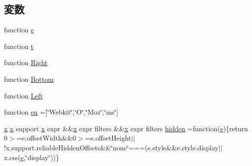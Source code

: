 \subsection*{変数}
\begin{DoxyCompactItemize}
\item 
function \hyperlink{jquery-1_810_82_8min_8js_a2c038346d47955cbe2cb91e338edd7e1}{e}
\item 
function \hyperlink{jquery-1_810_82_8min_8js_a23c5666e83bbbceee94adcd0851f50c4}{t}
\item 
function \hyperlink{jquery-1_810_82_8min_8js_ac7f66efc33d974809d85fc5bdb00c6eb}{Right}
\item 
function \hyperlink{jquery-1_810_82_8min_8js_aff76c1cba4a00c678dfce0e0c5a5538a}{Bottom}
\item 
function \hyperlink{jquery-1_810_82_8min_8js_abef68bf244a1159a49fe3a2c153a65d2}{Left}
\item 
function \hyperlink{jquery-1_810_82_8min_8js_a5d7a777130eac935addcf4926a74b23c}{en} =\mbox{[}\char`\"{}Webkit\char`\"{},\char`\"{}O\char`\"{},\char`\"{}Moz\char`\"{},\char`\"{}ms\char`\"{}\mbox{]}
\item 
\hyperlink{jquery-1_810_82_8min_8js_a5ce50d751c9664d05375c8f5080ed43e}{x} \hyperlink{jquery-1_810_82_8min_8js_a5ce50d751c9664d05375c8f5080ed43e}{x} support \hyperlink{jquery-1_810_82_8min_8js_a5ce50d751c9664d05375c8f5080ed43e}{x} expr \&\&\hyperlink{jquery-1_810_82_8min_8js_a5ce50d751c9664d05375c8f5080ed43e}{x} expr filters \&\&\hyperlink{jquery-1_810_82_8min_8js_a5ce50d751c9664d05375c8f5080ed43e}{x} expr filters \hyperlink{jquery-1_810_82_8min_8js_a086b6295ec8d15f090cd7239137a4979}{hidden} =function(\hyperlink{jribbble_8js_a2c038346d47955cbe2cb91e338edd7e1}{e})\{return 0$>$=e.\+offset\+Width\&\&0$>$=e.\+offset\+Height$\vert$$\vert$!x.\+support.\+reliable\+Hidden\+Offsets\&\&\char`\"{}none\char`\"{}===(e.\+style\&\&e.\+style.\+display$\vert$$\vert$x.\+css(\hyperlink{jribbble_8js_a2c038346d47955cbe2cb91e338edd7e1}{e},\char`\"{}display\char`\"{}))\}
\item 

\end{DoxyCompactItemize}
